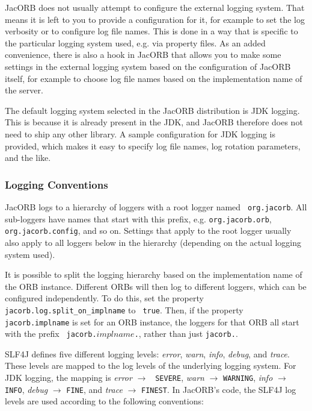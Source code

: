 JacORB does not usually attempt to configure the external logging
system.  That means it is left to you to provide a configuration for
it, for example to set the log verbosity or to configure log file
names.  This is done in a way that is specific to the particular
logging system used, e.g. via property files.  As an added
convenience, there is also a hook in JacORB that allows you to make
some settings in the external logging system based on the
configuration of JacORB itself, for example to choose log file names
based on the implementation name of the server.

The default logging system selected in the JacORB distribution is JDK
logging.  This is because it is already present in the JDK, and JacORB
therefore does not need to ship any other library.  A sample
configuration for JDK logging is provided, which makes it easy to
specify log file names, log rotation parameters, and the like.

\subsubsection{Logging Conventions}

JacORB logs to a hierarchy of loggers with a root logger named {\tt
 org.jacorb}.  All sub-loggers have names that start with this prefix,
e.g. {\tt org.jacorb.orb}, {\tt org.jacorb.config}, and so on.  Settings that
apply to the root logger usually also apply to all loggers below in
the hierarchy (depending on the actual logging system used).

It is possible to split the logging hierarchy based on the
implementation name of the ORB instance.  Different ORBs will then log
to different loggers, which can be configured independently.  To do
this, set the property {\tt jacorb.log.split\_on\_implname} to {\tt
  true}.  Then, if the property {\tt jacorb.implname} is set for an
ORB instance, the loggers for that ORB all start with the prefix {\tt
  jacorb.$implname$.}, rather than just {\tt jacorb.}.

SLF4J defines five different logging levels: \emph{error},
\emph{warn}, \emph{info}, \emph{debug}, and \emph{trace}.  These
levels are mapped to the log levels of the underlying logging system.
For JDK logging, the mapping is \emph{error} $\rightarrow$ {\tt
  SEVERE}, \emph{warn} $\rightarrow$ {\tt WARNING}, \emph{info}
$\rightarrow$ {\tt INFO}, \emph{debug} $\rightarrow$ {\tt FINE}, and
\emph{trace} $\rightarrow$ {\tt FINEST}.  In JacORB's code, the
SLF4J log levels are used according to the following conventions:


